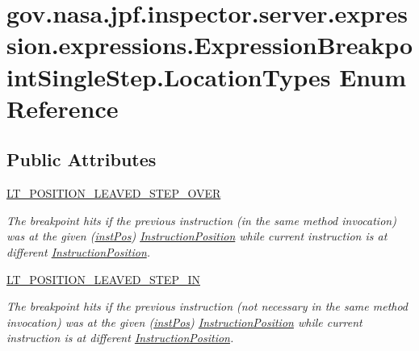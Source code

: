 \hypertarget{enumgov_1_1nasa_1_1jpf_1_1inspector_1_1server_1_1expression_1_1expressions_1_1_expression_breakp227857a8c42509ddd72c386e68619da4}{}\section{gov.\+nasa.\+jpf.\+inspector.\+server.\+expression.\+expressions.\+Expression\+Breakpoint\+Single\+Step.\+Location\+Types Enum Reference}
\label{enumgov_1_1nasa_1_1jpf_1_1inspector_1_1server_1_1expression_1_1expressions_1_1_expression_breakp227857a8c42509ddd72c386e68619da4}
\subsection*{Public Attributes}
\begin{DoxyCompactItemize}
\item 
\hyperlink{enumgov_1_1nasa_1_1jpf_1_1inspector_1_1server_1_1expression_1_1expressions_1_1_expression_breakp227857a8c42509ddd72c386e68619da4_a4b29cfc40330ff5457401ec92bd3365e}{L\+T\+\_\+\+P\+O\+S\+I\+T\+I\+O\+N\+\_\+\+L\+E\+A\+V\+E\+D\+\_\+\+S\+T\+E\+P\+\_\+\+O\+V\+ER}
\begin{DoxyCompactList}\small\item\em The breakpoint hits if the previous instruction (in the same method invocation) was at the given (\hyperlink{classgov_1_1nasa_1_1jpf_1_1inspector_1_1server_1_1expression_1_1expressions_1_1_expression_breakpoint_single_step_a72c10f41814ab478d923986e7c06b0da}{inst\+Pos}) \hyperlink{}{Instruction\+Position} while current instruction is at different \hyperlink{}{Instruction\+Position}. \end{DoxyCompactList}\item 
\hyperlink{enumgov_1_1nasa_1_1jpf_1_1inspector_1_1server_1_1expression_1_1expressions_1_1_expression_breakp227857a8c42509ddd72c386e68619da4_a6bd7cb0e72926134198a7eb26ae84c46}{L\+T\+\_\+\+P\+O\+S\+I\+T\+I\+O\+N\+\_\+\+L\+E\+A\+V\+E\+D\+\_\+\+S\+T\+E\+P\+\_\+\+IN}
\begin{DoxyCompactList}\small\item\em The breakpoint hits if the previous instruction (not necessary in the same method invocation) was at the given (\hyperlink{classgov_1_1nasa_1_1jpf_1_1inspector_1_1server_1_1expression_1_1expressions_1_1_expression_breakpoint_single_step_a72c10f41814ab478d923986e7c06b0da}{inst\+Pos}) \hyperlink{}{Instruction\+Position} while current instruction is at different \hyperlink{}{Instruction\+Position}. \end{DoxyCompactList}\end{DoxyCompactItemize}


